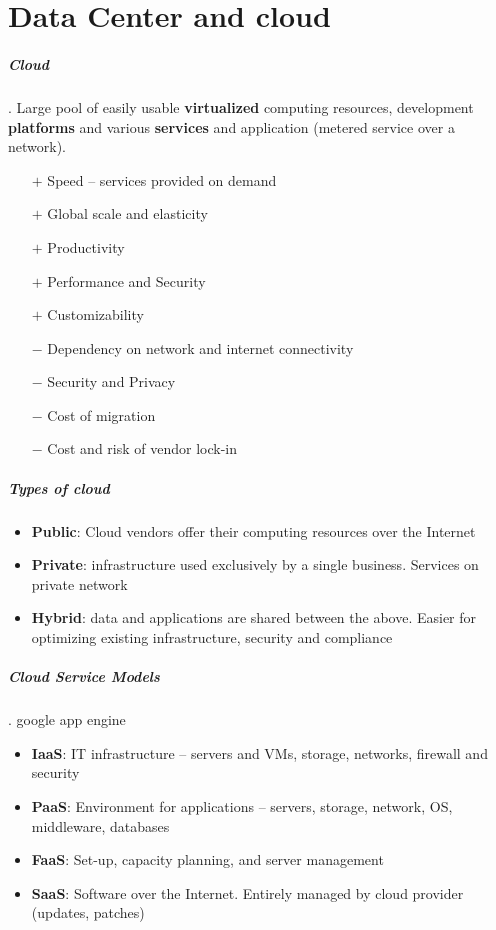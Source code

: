 \chapter{Data Center and cloud}

\paragraph{Cloud}. Large pool of easily usable \textbf{virtualized} computing
resources, development \textbf{platforms} and various \textbf{services} and
application (metered service over a network).
\begin{multicols}{2}
\begin{itemize}
\item[$+$] Speed – services provided on demand
\item[$+$] Global scale and elasticity
\item[$+$] Productivity
\item[$+$] Performance and Security
\item[$+$] Customizability
\item[$-$] Dependency on network and internet connectivity
\item[$-$] Security and Privacy
\item[$-$] Cost of migration
\item[$-$] Cost and risk of vendor lock-in
\end{itemize}
\end{multicols}

\paragraph{Types of cloud}
\begin{itemize}
\item \textbf{Public}: Cloud vendors offer their computing resources over the Internet
\item \textbf{Private}: infrastructure used exclusively by a single business. Services
  on private network
\item \textbf{Hybrid}: data and applications are shared between the above. Easier for
  optimizing existing infrastructure, security and compliance
\end{itemize}

\paragraph{Cloud Service Models}. google app engine
\begin{itemize}
  \item \textbf{IaaS}: IT infrastructure – servers and VMs, storage, networks, firewall and security
  \item \textbf{PaaS}: Environment for applications – servers, storage, network,
    OS, middleware, databases
  \item \textbf{FaaS}: Set-up, capacity planning, and server management
  \item \textbf{SaaS}: Software over the Internet. Entirely managed by cloud
    provider (updates, patches)
\end{itemize}

